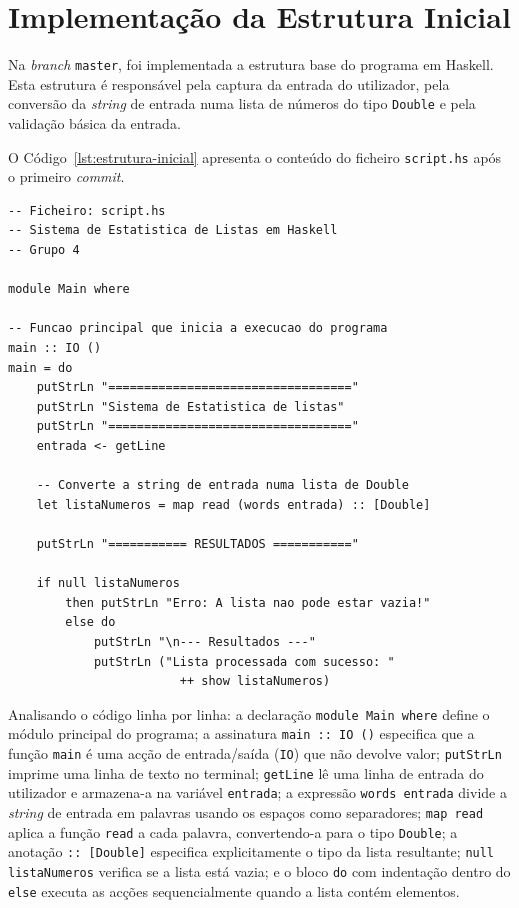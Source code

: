 \documentclass[12pt, a4paper, oneside]{report}
\begin{document}
\section{Implementação da Estrutura Inicial}

Na \textit{branch} \texttt{master}, foi implementada a estrutura base do programa em Haskell. Esta estrutura é responsável pela captura da entrada do utilizador, pela conversão da \textit{string} de entrada numa lista de números do tipo \texttt{Double} e pela validação básica da entrada.

O Código~\ref{lst:estrutura-inicial} apresenta o conteúdo do ficheiro \texttt{script.hs} após o primeiro \textit{commit}.

\begin{lstlisting}[style=haskell, caption={Estrutura inicial -- leitura e validação da entrada}, label=lst:estrutura-inicial]
-- Ficheiro: script.hs
-- Sistema de Estatistica de Listas em Haskell
-- Grupo 4

module Main where

-- Funcao principal que inicia a execucao do programa
main :: IO ()
main = do
    putStrLn "=================================="
    putStrLn "Sistema de Estatistica de listas"
    putStrLn "=================================="
    entrada <- getLine

    -- Converte a string de entrada numa lista de Double
    let listaNumeros = map read (words entrada) :: [Double]

    putStrLn "=========== RESULTADOS ==========="

    if null listaNumeros
        then putStrLn "Erro: A lista nao pode estar vazia!"
        else do
            putStrLn "\n--- Resultados ---"
            putStrLn ("Lista processada com sucesso: "
                        ++ show listaNumeros)
\end{lstlisting}

Analisando o código linha por linha: a declaração \texttt{module Main where} define o módulo principal do programa; a assinatura \texttt{main :: IO ()} especifica que a função \texttt{main} é uma acção de entrada/saída (\texttt{IO}) que não devolve valor; \texttt{putStrLn} imprime uma linha de texto no terminal; \texttt{getLine} lê uma linha de entrada do utilizador e armazena-a na variável \texttt{entrada}; a expressão \texttt{words entrada} divide a \textit{string} de entrada em palavras usando os espaços como separadores; \texttt{map read} aplica a função \texttt{read} a cada palavra, convertendo-a para o tipo \texttt{Double}; a anotação \texttt{:: [Double]} especifica explicitamente o tipo da lista resultante; \texttt{null listaNumeros} verifica se a lista está vazia; e o bloco \texttt{do} com indentação dentro do \texttt{else} executa as acções sequencialmente quando a lista contém elementos.
\end{document}
